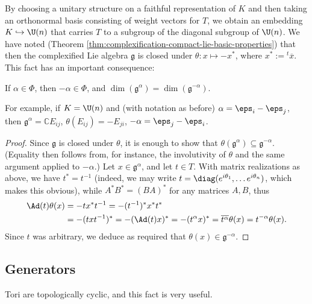 \documentclass[reqno]{amsart} 
\begin{document}
By choosing a unitary structure on a faithful representation of $K$ and then taking an orthonormal basis consisting of weight vectors for $T$, we obtain an embedding $K \hookrightarrow \U(n)$ that carries $T$ to a subgroup of the diagonal subgroup of $\U(n)$.  We have noted (Theorem \ref{thm:complexification-compact-lie-basic-properties}) that then the complexified Lie algebra $\mathfrak{g}$ is closed under $\theta : x \mapsto - x^*$, where $x^* := {}^t \overline{x}$.  This fact has an important consequence:
\begin{lemma}\label{lem:negative-roots-exist}
  If $\alpha \in \Phi$, then $- \alpha \in \Phi$, and $\dim(\mathfrak{g}^\alpha) = \dim(\mathfrak{g}^{-\alpha})$.
\end{lemma}
For example, if $K = \U(n)$ and (with notation as before) $\alpha = \eps_i - \eps_j$, then $\mathfrak{g}^\alpha = \mathbb{C} E_{i j}$, $\theta(E_{ij}) = - E_{j i}$, $- \alpha = \eps_j - \eps_i$.
\begin{proof}
  Since $\mathfrak{g}$ is closed under $\theta$, it is enough to show that $\theta(\mathfrak{g}^\alpha) \subseteq \mathfrak{g}^{-\alpha}$.  (Equality then follows from, for instance, the involutivity of $\theta$ and the same argument applied to $-\alpha$.)  Let $x \in \mathfrak{g}^\alpha$, and let $t \in T$.  With matrix realizations as above, we have $t^* = t^{-1}$ (indeed, we may write $t = \diag(e^{i \theta_1}, \dotsc e^{i \theta_n})$, which makes this obvious), while $A^* B^* = (B A)^*$ for any matrices $A,B$, thus
  \begin{align*}
    \Ad(t) \theta(x)
    &=
      -
      t
      x^*
      t^{-1}
      =
      - (t^{-1})^* x^* t^*
    \\
    &=
      -
      (t x t^{-1})^*
      =
      - (\Ad(t) x)^*
      = -(t^\alpha x)^*
      =
      \overline{t^\alpha } \theta(x)
      = t^{-\alpha} \theta(x).
  \end{align*}
  Since $t$ was arbitrary, we deduce as required that $\theta(x) \in \mathfrak{g}^{-\alpha}$.
\end{proof}

\subsection{Generators}\label{sec:cnh2vounyo}
Tori are topologically cyclic, and this fact is very useful.
\end{document}
